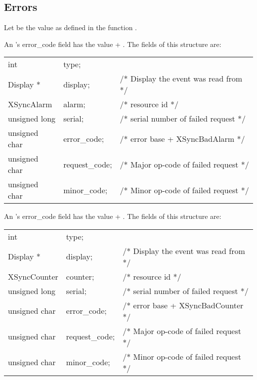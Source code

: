 \subsection{Errors}

Let  be the value 
as defined in the function .

An 's error\_code field has the value
 + .  The fields of
this structure are:

\begin{tabular}{lll}
int & type;	\\
Display * & display;& /* Display the event was read from */\\
XSyncAlarm &  alarm;& /* resource id */\\
unsigned long & serial;& /* serial number of failed request */\\
unsigned char & error\_code;&/* error base + XSyncBadAlarm */\\
unsigned char & request\_code;&/* Major op-code of failed request */\\
unsigned char & minor\_code;&/* Minor op-code of failed request */\\
\end{tabular}

An 's error\_code field has the value
 + .  The fields of
this structure are:

\begin{tabular}{lll}
int &type;\\
Display * & display;&	/* Display the event was read from */\\
XSyncCounter & counter;&	/* resource id */\\
unsigned long & serial;&	/* serial number of failed request */\\
unsigned char & error\_code;&/* error base + XSyncBadCounter */\\
unsigned char & request\_code;&/* Major op-code of failed request */\\
unsigned char & minor\_code;& /* Minor op-code of failed request */\\
\end{tabular}


